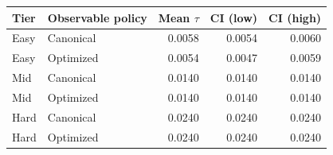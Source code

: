 \begin{tabular}{llrrr}
\hline
Tier & Observable policy & Mean $\tau$ & CI (low) & CI (high) \\
\hline
Easy & Canonical & 0.0058 & 0.0054 & 0.0060 \\
Easy & Optimized & 0.0054 & 0.0047 & 0.0059 \\
Mid & Canonical & 0.0140 & 0.0140 & 0.0140 \\
Mid & Optimized & 0.0140 & 0.0140 & 0.0140 \\
Hard & Canonical & 0.0240 & 0.0240 & 0.0240 \\
Hard & Optimized & 0.0240 & 0.0240 & 0.0240 \\
\hline
\end{tabular}
